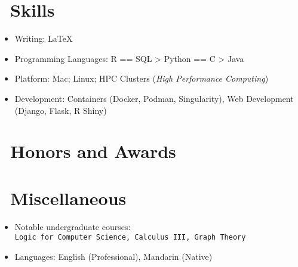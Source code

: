 \documentclass{resume}
\begin{document}

\section{\faCogs\ Skills}
\begin{itemize}[parsep=0.5ex]
  \item Writing: \LaTeX
  \item Programming Languages: R == SQL > Python == C > Java
  \item Platform: Mac; Linux; HPC Clusters (\emph{High Performance Computing}) 
  \item Development: Containers (Docker, Podman, Singularity), Web Development (Django, Flask, R Shiny)
\end{itemize}


\section{\faHeartO\ Honors and Awards}


\section{\faInfo\ Miscellaneous}
\begin{itemize}[parsep=0.5ex]
  \item Notable undergraduate courses: \\
      \texttt{Logic for Computer Science, Calculus III, Graph Theory}
  \item Languages: English (Professional), Mandarin (Native)
\end{itemize}



\phantom{}
\end{document}
